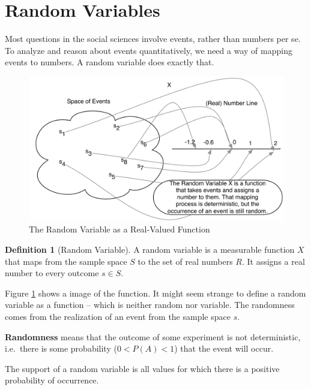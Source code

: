 \documentclass[
]{book}
\theoremstyle{definition}
\newtheorem{definition}{Definition}[chapter]
\theoremstyle{definition}
\theoremstyle{definition}
\theoremstyle{definition}
\theoremstyle{remark}
\begin{document}
\hypertarget{random-variables}{%
\section{Random Variables}\label{random-variables}}

Most questions in the social sciences involve events, rather than numbers per se. To analyze and reason about events quantitatively, we need a way of mapping events to numbers. A random variable does exactly that.

\begin{figure}
\centering
\includegraphics{images/rv.pdf}
\caption{\label{fig:rv-image}The Random Variable as a Real-Valued Function}
\end{figure}

\begin{definition}[Random Variable]
\protect\hypertarget{def:unnamed-chunk-258}{}{\label{def:unnamed-chunk-258} {} }
A random variable is a measurable function \(X\) that maps from the sample space \(S\) to the set of real numbers \(R.\) It assigns a real number to every outcome \(s \in S\).
\end{definition}

Figure \ref{fig:rv-image} shows a image of the function. It might seem strange to define a random variable as a function -- which is neither random nor variable. The randomness comes from the realization of an event from the sample space \(s\).

\textbf{Randomness} means that the outcome of some experiment is not deterministic, i.e.~there is some probability (\(0 < P(A) < 1\)) that the event will occur.

The support of a random variable is all values for which there is a positive probability of occurrence.
\end{document}
